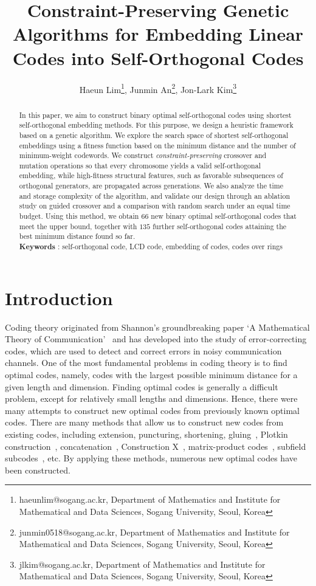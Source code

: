 \documentclass{article}
\title{Constraint-Preserving Genetic Algorithms for Embedding Linear Codes into Self-Orthogonal Codes}
\author{Haeun Lim\thanks{haeunlim@sogang.ac.kr, Department of Mathematics and Institute for Mathematical and Data Sciences, Sogang University, Seoul, Korea}, Junmin An\thanks{junmin0518@sogang.ac.kr, Department of Mathematics and Institute for Mathematical and Data Sciences, Sogang University, Seoul, Korea}, Jon-Lark Kim\thanks{jlkim@sogang.ac.kr, Department of Mathematics and Institute for Mathematical and Data Sciences, Sogang University, Seoul, Korea}}
\date{}
\begin{document}
\maketitle

\begin{abstract}
In this paper, we aim to construct binary optimal self-orthogonal codes using shortest self-orthogonal embedding methods. For this purpose, we design a heuristic framework based on a genetic algorithm. We explore the search space of shortest self-orthogonal embeddings using a fitness function based on the minimum distance and the number of minimum-weight codewords. We construct \emph{constraint-preserving} crossover and mutation operations so that every chromosome yields a valid self-orthogonal embedding, while high-fitness structural features, such as favorable subsequences of orthogonal generators, are propagated across generations. We also analyze the time and storage complexity of the algorithm, and validate our design through an ablation study on guided crossover and a comparison with random search under an equal time budget. Using this method, we obtain $66$ new binary optimal self-orthogonal codes that meet the upper bound, together with $135$ further self-orthogonal codes attaining the best minimum distance found so far.\\

\textbf{Keywords} : self-orthogonal code, LCD code, embedding of codes, codes over rings
\end{abstract}


\section{Introduction}
Coding theory originated from Shannon's groundbreaking paper `A Mathematical Theory of Communication'~\cite{mat-theory-comm} and has developed into the study of error-correcting codes, which are used to detect and correct errors in noisy communication channels. One of the most fundamental problems in coding theory is to find optimal codes, namely, codes with the largest possible minimum distance for a given length and dimension. Finding optimal codes is generally a difficult problem, except for relatively small lengths and dimensions. Hence, there were many attempts to construct new optimal codes from previously known optimal codes. There are many methods that allow us to construct new codes from existing codes, including extension, puncturing, shortening, gluing~\cite{ps-1975}, Plotkin construction~\cite{p-1960}, concatenation~\cite{f-1966}, Construction X~\cite{s-1972}, matrix-product codes~\cite{bn-2001}, subfield subcodes~\cite{d-1975}, etc. By applying these methods, numerous new optimal codes have been constructed.
\end{document}
